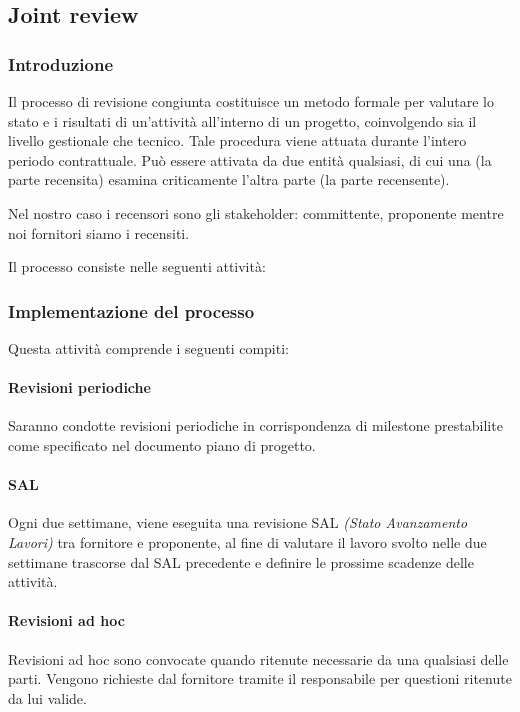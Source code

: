 \subsection{Joint review} 

\subsubsection{Introduzione}
Il processo di revisione congiunta costituisce un metodo formale per valutare lo stato e i risultati di un'attività all'interno di un progetto, coinvolgendo sia il livello gestionale che tecnico. Tale procedura viene attuata durante l'intero periodo contrattuale. Può essere attivata da due entità qualsiasi, di cui una (la parte recensita) esamina criticamente l'altra parte (la parte recensente).

Nel nostro caso i recensori sono gli stakeholder: committente, proponente mentre noi fornitori siamo i recensiti.

Il processo consiste nelle seguenti attività: 

\subsubsection{Implementazione del processo} 
Questa attività comprende i seguenti compiti:

\paragraph{Revisioni periodiche}
Saranno condotte revisioni periodiche in corrispondenza di milestone prestabilite come specificato nel documento piano di progetto.

\paragraph{SAL}
Ogni due settimane, viene eseguita una revisione SAL \textit{(Stato Avanzamento Lavori)} tra fornitore e proponente, al fine di valutare il lavoro svolto nelle due settimane trascorse dal SAL precedente e definire le prossime scadenze delle attività.

\paragraph{Revisioni ad hoc}
Revisioni ad hoc sono convocate quando ritenute necessarie da una qualsiasi delle parti.
Vengono richieste dal fornitore tramite il responsabile per questioni ritenute da lui valide.

